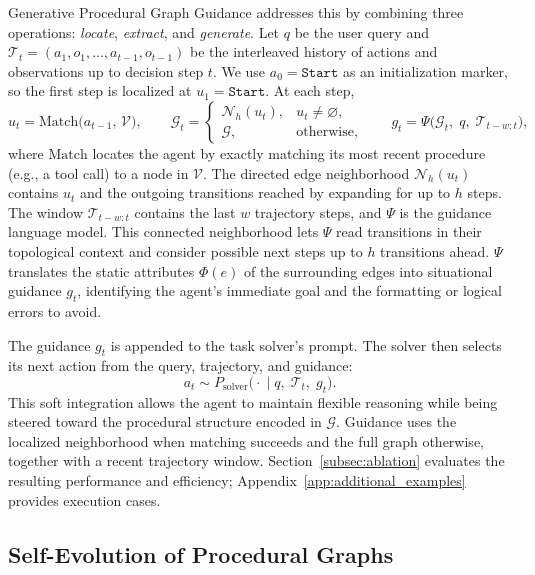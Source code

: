 Generative Procedural Graph Guidance addresses this by combining three operations: \emph{locate}, \emph{extract}, and \emph{generate}. Let $q$ be the user query and $\mathcal{T}_t = (a_1, o_1, \dots, a_{t-1}, o_{t-1})$ be the interleaved history of actions and observations up to decision step $t$. We use $a_0 = \texttt{Start}$ as an initialization marker, so the first step is localized at $u_1 = \texttt{Start}$. At each step,
\begin{equation}
    u_t = \mathrm{Match}\big(a_{t-1}, \, \mathcal{V}\big), \qquad
    \mathcal{G}_t =
    \begin{cases}
        \mathcal{N}_h(u_t), & u_t \neq \varnothing, \\
        \mathcal{G}, & \text{otherwise,}
    \end{cases}
    \qquad
    g_t = \Psi\big(\mathcal{G}_t, \; q, \; \mathcal{T}_{t-w:t}\big),
\end{equation}
where $\mathrm{Match}$ locates the agent by exactly matching its most recent procedure (e.g., a tool call) to a node in $\mathcal{V}$. The directed edge neighborhood $\mathcal{N}_h(u_t)$ contains $u_t$ and the outgoing transitions reached by expanding for up to $h$ steps. The window $\mathcal{T}_{t-w:t}$ contains the last $w$ trajectory steps, and $\Psi$ is the guidance language model. This connected neighborhood lets $\Psi$ read transitions in their topological context and consider possible next steps up to $h$ transitions ahead. $\Psi$ translates the static attributes $\Phi(e)$ of the surrounding edges into situational guidance $g_t$, identifying the agent's immediate goal and the formatting or logical errors to avoid.

The guidance $g_t$ is appended to the task solver's prompt. The solver then selects its next action from the query, trajectory, and guidance:
\begin{equation}
    a_t \sim P_{\text{solver}}\big(\cdot \;\big|\; q, \; \mathcal{T}_t, \; g_t\big).
\end{equation}
This soft integration allows the agent to maintain flexible reasoning while being steered toward the procedural structure encoded in $\mathcal{G}$. Guidance uses the localized neighborhood when matching succeeds and the full graph otherwise, together with a recent trajectory window. Section~\ref{subsec:ablation} evaluates the resulting performance and efficiency; Appendix~\ref{app:additional_examples} provides execution cases.

\subsection{Self-Evolution of Procedural Graphs}
\label{subsec:offline_evolution}


